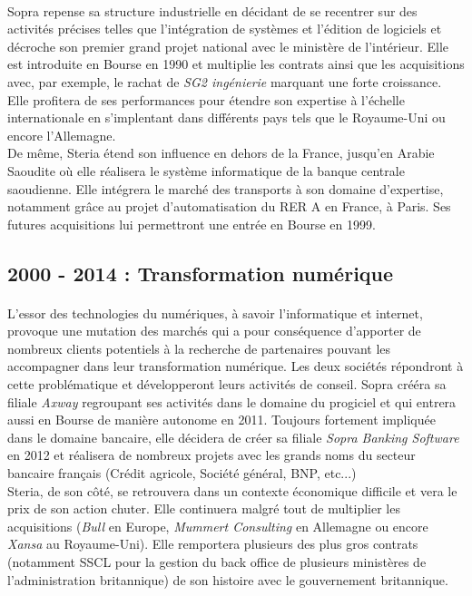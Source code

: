 \paragraph{}
Sopra repense sa structure industrielle en décidant de se recentrer sur des activités précises telles que l'intégration de systèmes et l'édition de logiciels et décroche son premier grand projet national avec le ministère de l'intérieur. Elle est introduite en Bourse en 1990 et multiplie les contrats ainsi que les acquisitions avec, par exemple, le rachat de \textit{SG2 ingénierie} marquant une forte croissance. Elle profitera de ses performances pour étendre son expertise à l'échelle internationale en s'implentant dans différents pays tels que le Royaume-Uni ou encore l'Allemagne.\\

De même, Steria étend son influence en dehors de la France, jusqu'en Arabie Saoudite où elle réalisera le système informatique de la banque centrale saoudienne. Elle intégrera le marché des transports à son domaine d'expertise, notamment grâce au projet d'automatisation du RER A en France, à Paris. Ses futures acquisitions lui permettront une entrée en Bourse en 1999.\\

\subsection{2000 - 2014 : Transformation numérique}

\paragraph{}
L'essor des technologies du numériques, à savoir l'informatique et internet, provoque une mutation des marchés qui a pour conséquence d'apporter de nombreux clients potentiels à la recherche de partenaires pouvant les accompagner dans leur transformation numérique. Les deux sociétés répondront à cette problématique et développeront leurs activités de conseil. Sopra crééra sa filiale \textit{Axway} regroupant ses activités dans le domaine du progiciel et qui entrera aussi en Bourse de manière autonome en 2011. Toujours fortement impliquée dans le domaine bancaire, elle décidera de créer sa filiale \textit{Sopra Banking Software} en 2012 et réalisera de nombreux projets avec les grands noms du secteur bancaire français (Crédit agricole, Société général, BNP, etc...)\\

Steria, de son côté, se retrouvera dans un contexte économique difficile et vera le prix de son action chuter. Elle continuera malgré tout de multiplier les acquisitions (\textit{Bull} en Europe, \textit{Mummert Consulting} en Allemagne ou encore \textit{Xansa} au Royaume-Uni). Elle remportera plusieurs des plus gros contrats (notamment SSCL pour la gestion du back office de plusieurs ministères de l'administration britannique) de son histoire avec le gouvernement britannique.


